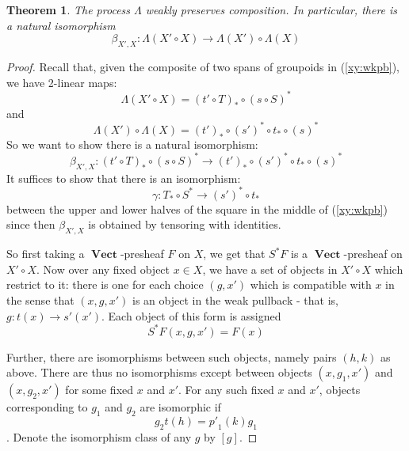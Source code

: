 \documentclass[10pt]{amsart}
\newtheorem{theorem}{Theorem}
\numberwithin{theorem}{subsection}
\newcommand{\ra}{\mathop{\rightarrow}}
\newcommand{\opname}[1]{\operatorname{#1}}
\newcommand{\catname}[1]{\boldsymbol{\opname{{#1}}}}
\newcommand{\V}{\catname{Vect}}
\newcommand{\FV}{\Lambda}
\begin{document}
\begin{theorem}\label{thm:FVcomposfunc}The process $\FV$ weakly
preserves composition.  In particular, there is a natural isomorphism
\begin{equation}
\beta_{X',X} : \FV(X' \circ X) \ra \FV(X') \circ \FV(X)
\end{equation}
\end{theorem}
\begin{proof}
Recall that, given the composite of two spans of groupoids in
(\ref{xy:wkpb}), we have 2-linear maps:
\begin{equation}
\FV(X' \circ X) = (t' \circ T)_{\ast} \circ (s \circ S)^{\ast}
\end{equation}
and 
\begin{equation}
\FV(X') \circ \FV(X) = (t')_{\ast} \circ (s')^{\ast} \circ t_{\ast} \circ (s)^{\ast}
\end{equation}
So we want to show there is a natural isomorphism:
\begin{equation}
\beta_{X',X} : (t' \circ T)_{\ast} \circ (s \circ S)^{\ast} \ra
(t')_{\ast} \circ (s')^{\ast} \circ t_{\ast} \circ (s)^{\ast}
\end{equation}
It suffices to show that there is an isomorphism:
\begin{equation}
\gamma: T_{\ast} \circ S^{\ast} \ra (s')^{\ast} \circ t_{\ast}
\end{equation}
between the upper and lower halves of the square in the middle of
(\ref{xy:wkpb}) since then $\beta_{X',X}$ is obtained by tensoring
with identities.

So first taking a $\V$-presheaf $F$ on ${X}$, we get that
$S^{\ast}F$ is a $\V$-presheaf on ${X' \circ X}$.  Now over any
fixed object $x \in X$, we have a set of objects in ${X'
\circ X}$ which restrict to it: there is one for each choice $(g,x')$
which is compatible with $x$ in the sense that $(x,g,x')$ is an object
in the weak pullback - that is, $g: t(x) \ra s'(x')$.  Each
object of this form is assigned
\[ 
S^{\ast}F(x,g,x') = F(x)
\]

Further, there are isomorphisms between such objects, namely pairs
$(h,k)$ as above.  There are thus no isomorphisms except between
objects $(x,g_1,x')$ and $(x,g_2,x')$ for some fixed $x$ and $x'$.
For any such fixed $x$ and $x'$, objects corresponding to $g_1$ and
$g_2$ are isomorphic if
\begin{equation}
g_2 t(h)  = {p'}_1(k) g_1
\end{equation}.
Denote the isomorphism class of any $g$ by $[g]$.


\end{proof}
\end{document}
